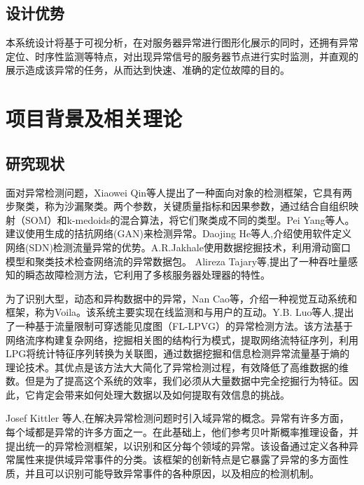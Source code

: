 \subsection{设计优势}
本系统设计将基于可视分析，在对服务器异常进行图形化展示的同时，还拥有异常定位、时序性监测等特点，对出现异常信号的服务器节点进行实时监测，并直观的展示造成该异常的任务，从而达到快速、准确的定位故障的目的。
\section{项目背景及相关理论}
\subsection{研究现状}
{面对异常检测问题}，Xiaowei Qin等人提出了一种{面向对象的检测框架}，它具有两步聚类，称为沙漏聚类。两个参数，关键质量指标和因果参数，通过结合自组织映射（SOM）和k-medoids的混合算法，将它们聚类成不同的类型。{Pei Yang等人}。建议使用生成的拮抗网络(GAN)来检测异常。{Daojing He等人},介绍使用软件定义网络(SDN)检测流量异常的优势。A.R.Jakhale使用{数据挖掘}技术，利用滑动窗口模型和聚类技术检查网络流的异常数据包。 {Alireza Tajary}等,提出了一种吞吐量感知的瞬态故障检测方法，它利用了多核服务器处理器的特性。

为了识别大型，动态和异构数据中的异常，Nan Cao等，介绍一种视觉互动系统和框架，称为Voila。该系统主要实现在线监测和与用户的互动。{Y.B. Luo等人},提出了一种基于流量限制可穿透能见度图（FL-LPVG）的异常检测方法。该方法基于网络流序构建复杂网络，挖掘相关图的结构行为模式，提取网络流特征序列，利用LPG将统计特征序列转换为关联图，通过数据挖掘和信息检测异常流量基于熵的理论技术。其优点是该方法大大简化了异常检测过程，有效降低了高维数据的维数。但是为了提高这个系统的效率，我们必须从大量数据中完全挖掘行为特征。因此，它肯定会带来如何处理大数据以及如何提取有效信息的挑战。

{Josef Kittler 等人},在解决异常检测问题时引入{域异常的概念}。异常有许多方面，每个域都是异常的许多方面之一。在此基础上，他们参考贝叶斯概率推理设备，并提出统一的{异常检测框架}，以识别和区分每个领域的异常。该设备通过定义各种异常属性来提供域异常事件的分类。该框架的创新特点是它暴露了异常的多方面性质，并且可以识别可能导致异常事件的各种原因，以及相应的检测机制。

